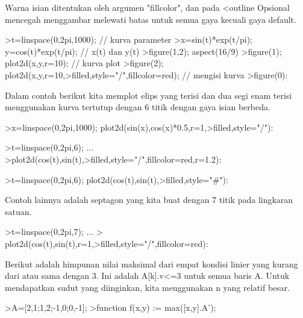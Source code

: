 \documentclass{article}
\begin{document}
\begin{eulernotebook}
\begin{eulercomment}
\begin{eulercomment}
\begin{eulercomment}
\begin{eulercomment}
\begin{eulercomment}
Warna isian ditentukan oleh argumen "fillcolor", dan pada \textless{}outline
Opsional mencegah menggambar melewati batas untuk semua gaya kecuali
gaya default.
\end{eulercomment}
\begin{eulerprompt}
>t=linspace(0,2pi,1000); // kurva parameter
>x=sin(t)*exp(t/pi); y=cos(t)*exp(t/pi); // x(t) dan y(t)
>figure(1,2); aspect(16/9)
>figure(1); plot2d(x,y,r=10); // kurva plot
>figure(2); plot2d(x,y,r=10,>filled,style="/",fillcolor=red); // mengisi kurva
>figure(0):
\end{eulerprompt}
\begin{eulercomment}
Dalam contoh berikut kita memplot elips yang terisi dan dua segi enam
terisi menggunakan kurva tertutup dengan 6 titik dengan gaya isian
berbeda.
\end{eulercomment}
\begin{eulerprompt}
>x=linspace(0,2pi,1000); plot2d(sin(x),cos(x)*0.5,r=1,>filled,style="/"):
\end{eulerprompt}
\begin{eulerprompt}
>t=linspace(0,2pi,6); ...
>plot2d(cos(t),sin(t),>filled,style="/",fillcolor=red,r=1.2):
\end{eulerprompt}
\begin{eulerprompt}
>t=linspace(0,2pi,6); plot2d(cos(t),sin(t),>filled,style="#"):
\end{eulerprompt}
\begin{eulercomment}
Contoh lainnya adalah septagon yang kita buat dengan 7 titik pada
lingkaran satuan.
\end{eulercomment}
\begin{eulerprompt}
>t=linspace(0,2pi,7);  ...
> plot2d(cos(t),sin(t),r=1,>filled,style="/",fillcolor=red):
\end{eulerprompt}
\begin{eulercomment}
Berikut adalah himpunan nilai maksimal dari empat kondisi linier yang
kurang dari atau sama dengan 3. Ini adalah A[k].v\textless{}=3 untuk semua baris
A. Untuk mendapatkan sudut yang diinginkan, kita menggunakan n yang
relatif besar.
\end{eulercomment}
\begin{eulerprompt}
>A=[2,1;1,2;-1,0;0,-1];
>function f(x,y) := max([x,y].A');

\end{eulerprompt}
\end{eulercomment}
\end{eulercomment}
\end{eulercomment}
\end{eulercomment}
\end{eulernotebook}
\end{document}
